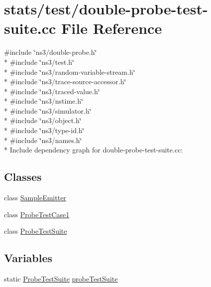\hypertarget{double-probe-test-suite_8cc}{}\section{stats/test/double-\/probe-\/test-\/suite.cc File Reference}
\label{double-probe-test-suite_8cc}
{\ttfamily \#include \char`\"{}ns3/double-\/probe.\+h\char`\"{}}\\*
{\ttfamily \#include \char`\"{}ns3/test.\+h\char`\"{}}\\*
{\ttfamily \#include \char`\"{}ns3/random-\/variable-\/stream.\+h\char`\"{}}\\*
{\ttfamily \#include \char`\"{}ns3/trace-\/source-\/accessor.\+h\char`\"{}}\\*
{\ttfamily \#include \char`\"{}ns3/traced-\/value.\+h\char`\"{}}\\*
{\ttfamily \#include \char`\"{}ns3/nstime.\+h\char`\"{}}\\*
{\ttfamily \#include \char`\"{}ns3/simulator.\+h\char`\"{}}\\*
{\ttfamily \#include \char`\"{}ns3/object.\+h\char`\"{}}\\*
{\ttfamily \#include \char`\"{}ns3/type-\/id.\+h\char`\"{}}\\*
{\ttfamily \#include \char`\"{}ns3/names.\+h\char`\"{}}\\*
Include dependency graph for double-\/probe-\/test-\/suite.cc\+:
\subsection*{Classes}
\begin{DoxyCompactItemize}
\item 
class \hyperlink{classSampleEmitter}{Sample\+Emitter}
\item 
class \hyperlink{classProbeTestCase1}{Probe\+Test\+Case1}
\item 
class \hyperlink{classProbeTestSuite}{Probe\+Test\+Suite}
\end{DoxyCompactItemize}
\subsection*{Variables}
\begin{DoxyCompactItemize}
\item 
static \hyperlink{classProbeTestSuite}{Probe\+Test\+Suite} \hyperlink{double-probe-test-suite_8cc_a27d2fce76c49ef17fd623051f2f20f21}{probe\+Test\+Suite}
\end{DoxyCompactItemize}


